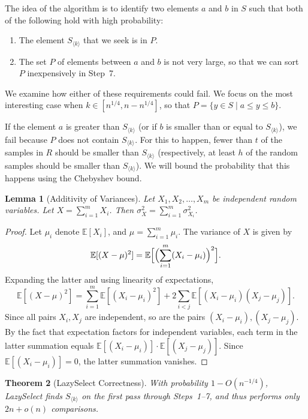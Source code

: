 \documentclass[twoside,12pt]{book}
\theoremstyle{plain}
\newtheorem{theorem}{Theorem}[chapter]
\newtheorem{lemma}[theorem]{Lemma}
\theoremstyle{definition}
\theoremstyle{remark}
\begin{document}
The idea of the algorithm is to identify two elements $a$ and $b$ in $S$ such that both of the following hold with high probability:
\begin{enumerate}
\item The element $S_{\langle k \rangle}$ that we seek is in $P$.
\item The set $P$ of elements between $a$ and $b$ is not very large, so that we can sort $P$ inexpensively in Step~7.
\end{enumerate}

We examine how either of these requirements could fail. We focus on the most interesting case when $k \in [n^{1/4}, n - n^{1/4}]$, so that $P = \{y \in S \mid a \leq y \leq b\}$.

If the element $a$ is greater than $S_{\langle k \rangle}$ (or if $b$ is smaller than or equal to $S_{\langle k \rangle}$), we fail because $P$ does not contain $S_{\langle k \rangle}$. For this to happen, fewer than $t$ of the samples in $R$ should be smaller than $S_{\langle k \rangle}$ (respectively, at least $h$ of the random samples should be smaller than $S_{\langle k \rangle}$). We will bound the probability that this happens using the Chebyshev bound.

\begin{lemma}[Additivity of Variances]
\label{lemma:var-sum}
Let $X_1, X_2, \ldots, X_m$ be independent random variables. Let $X = \sum_{i=1}^{m} X_i$. Then $\sigma_X^2 = \sum_{i=1}^{m} \sigma_{X_i}^2$.
\end{lemma}

\begin{proof}
Let $\mu_i$ denote $\mathbb{E}[X_i]$, and $\mu = \sum_{i=1}^{m} \mu_i$. The variance of $X$ is given by
\[
\mathbb{E}[(X - \mu)^2] = \mathbb{E}\Bigl[\Bigl(\sum_{i=1}^{m} (X_i - \mu_i)\Bigr)^2\Bigr].
\]
Expanding the latter and using linearity of expectations,
\[
\mathbb{E}[(X - \mu)^2] = \sum_{i=1}^{m} \mathbb{E}[(X_i - \mu_i)^2] + 2 \sum_{i < j} \mathbb{E}[(X_i - \mu_i)(X_j - \mu_j)].
\]
Since all pairs $X_i, X_j$ are independent, so are the pairs $(X_i - \mu_i), (X_j - \mu_j)$. By the fact that expectation factors for independent variables, each term in the latter summation equals $\mathbb{E}[(X_i - \mu_i)] \cdot \mathbb{E}[(X_j - \mu_j)]$. Since $\mathbb{E}[(X_i - \mu_i)] = 0$, the latter summation vanishes.
\end{proof}

\begin{theorem}[LazySelect Correctness]
\label{thm:lazy-select}
With probability $1 - O(n^{-1/4})$, LazySelect finds $S_{\langle k \rangle}$ on the first pass through Steps~1--7, and thus performs only $2n + o(n)$ comparisons.
\end{theorem}
\end{document}
